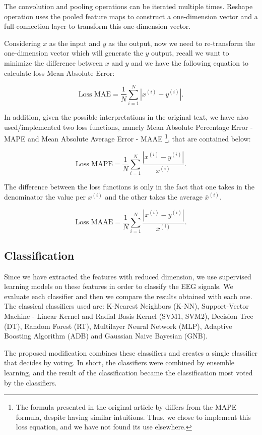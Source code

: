 The convolution and pooling operations can be iterated multiple times. Reshape operation uses the pooled feature maps to construct a one-dimension vector and a full-connection layer to transform this one-dimension vector. 

Considering $x$ as the input and $y$ as the output, now we need to re-transform the one-dimension vector which will generate the $y$ output, recall we want to minimize the difference between $x$ and $y$ and we have the following equation to calculate loss Mean Absolute Error:

$$\text{Loss MAE}= \frac{1}{N} \sum_{i=1}^N |x^{(i)} - y^{(i)}| .$$


In addition, given the possible interpretations in the original text, we have also used/implemented two loss functions, namely Mean Absolute Percentage Error - MAPE and Mean Absolute Average Error - MAAE \footnote{The formula presented in the original article by \cite{WenZha:2018} differs from the MAPE formula, despite having similar intuitions. Thus, we chose to implement this loss equation, and we have not found its use elsewhere.}, that are contained below:


$$\text{Loss MAPE}= \frac{1}{N} \sum_{i=1}^N \frac{|x^{(i)} - y^{(i)}|}{x^{(i)}} .$$

The difference between the loss functions is only in the fact that one takes in the denominator the value per $x^{(i)}$ and the other takes the average ${\bar x^{(i)}}$.

$$\text{Loss MAAE}= \frac{1}{N} \sum_{i=1}^N \frac{|x^{(i)} - y^{(i)}|}{{\bar x^{(i)}}} .$$


\subsection{Classification}

Since we have extracted the features with reduced dimension, we use supervised learning models on these features in order to classify the EEG signals. We evaluate each classifier and then we compare the results obtained with each one. The classical classifiers used are: K-Nearest Neighbors (K-NN), Support-Vector Machine - Linear Kernel and Radial Basis Kernel (SVM1, SVM2), Decision Tree (DT), Random Forest (RT), Multilayer Neural Network (MLP), Adaptive Boosting Algorithm (ADB) and Gaussian Naive Bayesian (GNB).
 
The proposed modification combines these classifiers and creates a single classifier that decides by voting. In short, the classifiers were combined by ensemble learning, and the result of the classification became the classification most voted by the classifiers.


